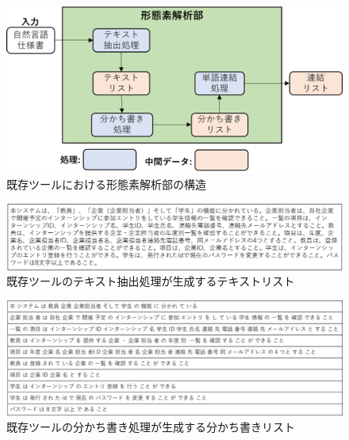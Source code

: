 \begin{figure}[tp]
    \begin{center}
        \includegraphics[width=1.0\columnwidth]{image/exis_mor_structure.png}
        \caption{既存ツールにおける形態素解析部の構造}
        \label{fig:exis_mor_structure}
    \end{center}
\end{figure}

\begin{figure}[tp]
    \begin{center}
        \includegraphics[width=1.0\columnwidth]{image/exis_text_list.png}
        \caption{既存ツールのテキスト抽出処理が生成するテキストリスト}
        \label{fig:exis_text_list}
    \end{center}
\end{figure}

\begin{figure}[tp]
    \begin{center}
        \includegraphics[width=1.0\columnwidth]{image/exis_wakati_list.png}
        \caption{既存ツールの分かち書き処理が生成する分かち書きリスト}
        \label{fig:exis_wakati_list}
    \end{center}
\end{figure}

